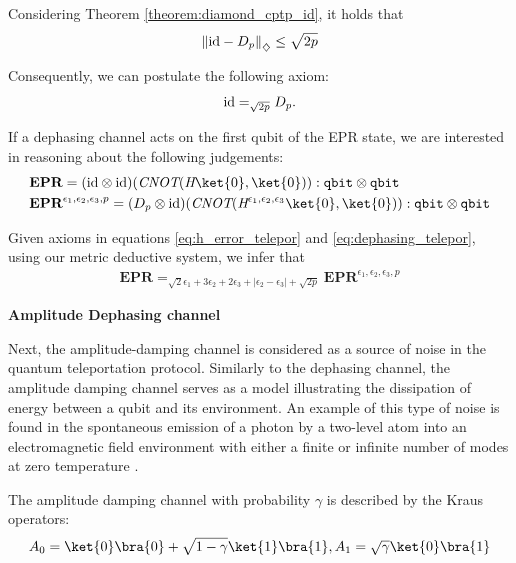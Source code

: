 \begin{example}
     Considering Theorem \ref{theorem:diamond_cptp_id}, it holds that
     \begin{align*}
        \left\lVert  \mathrm{id} - D_p \right\rVert_{\diamondsuit} \leq \sqrt{2p}
     \end{align*}

     Consequently, we can postulate the following axiom:
      \begin{align} \label{eq:dephasing_telepor}
         \mathrm{id} =_{\sqrt{2p}}  D_p  .
      \end{align}

     If a dephasing channel acts on the first qubit of the EPR state, we are interested in reasoning about the following judgements:
     \begin{align*}
      &\textbf{EPR} = (\id \otimes \id)(\emph{CNOT} (\emph{H}\ket{0},\ket{0})) : \mathtt{qbit} \otimes
      \mathtt{qbit}  \\ 
      &\textbf{EPR}^{\epsilon_1,\epsilon_2, \epsilon_3,p} =  (D_p \otimes \id) (\emph{CNOT} ( \emph{H}^{\epsilon_1,\epsilon_2, \epsilon_3}\ket{0},\ket{0})) : \mathtt{qbit} \otimes
      \mathtt{qbit} 
   \end{align*}

   Given axioms in equations \eqref{eq:h_error_telepor} and \eqref{eq:dephasing_telepor}, using our metric deductive system, we infer that
   \begin{align} \label{eq:epr_error_teleport}
    \textbf{EPR} =_{\sqrt{2}\epsilon_1 + 3 \epsilon_2 + 2\epsilon_3 + |\epsilon_2-\epsilon_3| + \sqrt{2p}} \textbf{EPR}^{\epsilon_1,\epsilon_2, \epsilon_3,p}
   \end{align}


     \textbf{Amplitude Dephasing channel}

     Next, the amplitude-damping channel is considered as a source of noise in the quantum teleportation protocol. Similarly to the dephasing channel, the amplitude damping channel serves as a model illustrating the dissipation of energy between a qubit and its environment. An example of this type of noise is found in the spontaneous emission of a photon by a two-level atom into an electromagnetic field environment with either a finite or infinite number of modes at zero temperature \cite{salles2008experimental, Wang_2011}.

     The amplitude damping channel with probability $\gamma$ is described by the Kraus operators:
\begin{equation*}
     A_{0}= \ket{0} \bra{0} + \sqrt{1-\gamma} \ket{1} \bra{1} ,  A_{1}= \sqrt{\gamma} \ket{0} \bra{1}
\end{equation*}


\end{example}
